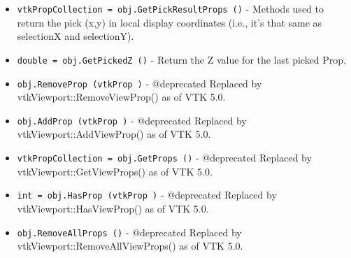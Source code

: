 \begin{itemize}
\item  \verb|vtkPropCollection = obj.GetPickResultProps ()| -  Methods used to return the pick (x,y) in local display coordinates (i.e.,
 it's that same as selectionX and selectionY).

\item  \verb|double = obj.GetPickedZ ()| -  Return the Z value for the last picked Prop.

\item  \verb|obj.RemoveProp (vtkProp )| -  @deprecated Replaced by vtkViewport::RemoveViewProp() as of VTK 5.0.

\item  \verb|obj.AddProp (vtkProp )| -  @deprecated Replaced by vtkViewport::AddViewProp() as of VTK 5.0.

\item  \verb|vtkPropCollection = obj.GetProps ()| -  @deprecated Replaced by vtkViewport::GetViewProps() as of VTK 5.0.

\item  \verb|int = obj.HasProp (vtkProp )| -  @deprecated Replaced by vtkViewport::HasViewProp() as of VTK 5.0.

\item  \verb|obj.RemoveAllProps ()| -  @deprecated Replaced by vtkViewport::RemoveAllViewProps() as of VTK 5.0.

\end{itemize}
